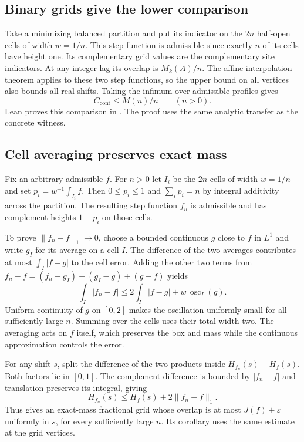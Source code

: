 \documentclass[sigplan,10pt,anonymous,review,balance=false]{acmart}
\newcommand{\ct}{C_{\mathrm{cont}}}
\begin{document}
\subsection{Binary grids give the lower comparison}
\label{sec:grid-lower}

Take a minimizing balanced partition and put its indicator on
the $2n$ half-open cells of width $w=1/n$. This step function
is admissible since exactly $n$ of its cells have height one.
Its complementary grid values are the complementary site
indicators. At any integer lag its overlap is $M_k(A)/n$.
The affine interpolation theorem applies to these two step
functions, so the upper bound on all vertices also bounds all
real shifts. Taking the infimum over admissible profiles gives
\begin{equation}
 \ct\le M(n)/n \qquad(n>0).
 \label{eq:grid-lower}
\end{equation}
Lean proves this comparison in
. The proof uses
the same analytic transfer as the concrete witness.

\subsection{Cell averaging preserves exact mass}
\label{sec:cell-averages}

Fix an arbitrary admissible $f$. For $n>0$ let $I_i$ be the
$2n$ cells of width $w=1/n$ and set
$p_i=w^{-1}\int_{I_i} f$. Then $0\le p_i\le1$ and
$\sum_i p_i=n$ by integral additivity across the partition.
The resulting step function $f_n$ is admissible and has
complement heights $1-p_i$ on those cells.

To prove $\|f_n-f\|_1\to0$, choose a bounded continuous $g$
close to $f$ in $L^1$ and write $g_I$ for its average on a cell
$I$. The difference of the two averages contributes at most
$\int_I |f-g|$ to the cell error. Adding the other two terms
from $f_n-f=(f_n-g_I)+(g_I-g)+(g-f)$ yields
\[
 \int_I |f_n-f|
 \le 2\int_I |f-g|+w\,\operatorname{osc}_I(g).
\]
Uniform continuity of $g$ on $[0,2]$ makes the oscillation
uniformly small for all sufficiently large $n$. Summing over
the cells uses their total width two. The averaging acts on
$f$ itself, which preserves the box and mass while the
continuous approximation controls the error.

For any shift $s$, split the difference of the two products
inside $H_{f_n}(s)-H_f(s)$. Both factors lie in $[0,1]$. The
complement difference is bounded by $|f_n-f|$ and translation
preserves its integral, giving
\begin{equation}
 H_{f_n}(s)\le H_f(s)+2\|f_n-f\|_1.
 \label{eq:overlap-stability}
\end{equation}
Thus  gives an exact-mass
fractional grid whose overlap is at most $J(f)+\varepsilon$
uniformly in $s$, for every sufficiently large $n$. Its
corollary  uses the same estimate at
the grid vertices.
\end{document}
